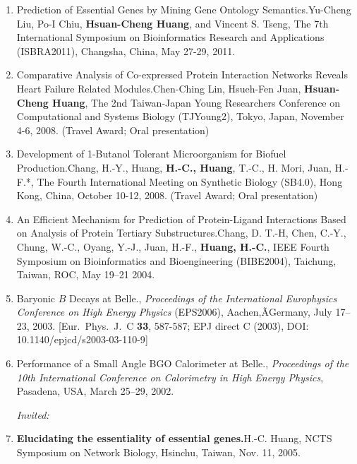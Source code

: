 \documentclass[10pt,a4paper]{article}
\def\mypub#1#2#3{{#1.}\newline #2, #3.}
\def\newpub#1#2#3{{\boldmath \bf #2.}\newline #1, #3.}
\begin{document}
\begin{enumerate}
\item
\mypub
{Prediction of Essential Genes by Mining Gene Ontology Semantics}
{Yu-Cheng Liu, Po-I Chiu, {\bf Hsuan-Cheng Huang}, and Vincent S. Tseng}
{The 7th International Symposium on Bioinformatics Research and Applications (ISBRA2011), Changsha, China, May 27-29, 2011}

\item
\mypub
{Comparative Analysis of Co-expressed Protein Interaction Networks Reveals Heart Failure Related Modules}
{Chen-Ching Lin, Hsueh-Fen Juan, {\bf Hsuan-Cheng Huang}}
{The 2nd Taiwan-Japan Young Researchers Conference on Computational and Systems Biology (TJYoung2), Tokyo, Japan, November 4-6, 2008}
(Travel Award; Oral presentation)

\item
\mypub
{Development of 1-Butanol Tolerant Microorganism for Biofuel Production}
{Chang, H.-Y., Huang, {\bf H.-C., Huang}, T.-C., H. Mori, Juan, H.-F.*} 
 {The Fourth International Meeting on Synthetic Biology (SB4.0), Hong Kong, China, October 10-12, 2008}
 (Travel Award; Oral presentation)

\item
\mypub
{An Efficient Mechanism for Prediction of Protein-Ligand Interactions Based on Analysis of Protein Tertiary Substructures}
{Chang, D. T.-H, Chen, C.-Y., Chung, W.-C., Oyang, Y.-J., Juan, H.-F., {\bf Huang, H.-C.}}
{IEEE Fourth Symposium on Bioinformatics and Bioengineering (BIBE2004), Taichung, Taiwan, ROC, May 19--21 2004}

\item
\mypub{Baryonic $B$ Decays at Belle}
{{\bf Hsuan-Cheng Huang}}
{{\it Proceedings of the International Europhysics Conference on High Energy Physics} (EPS2006), Aachen,ÃGermany, July 17--23, 2003}
[{Eur.\ Phys.\ J.\ C {\bf 33}, 587-587; EPJ direct C (2003), DOI: 10.1140/epjcd/s2003-03-110-9}]

\item
\mypub{Performance of a Small Angle BGO Calorimeter at Belle}
{{\bf H. C. Huang}}
{{\it Proceedings of the 10th International
Conference on Calorimetry in High Energy Physics}, Pasadena, USA, March 25--29, 2002}

\clearpage
\hspace{-0.4in} {\it Invited:}
~
\item
\newpub
{H.-C. Huang}
{Elucidating the essentiality of essential genes}
{NCTS Symposium on Network Biology, Hsinchu, Taiwan, Nov. 11, 2005}


\end{enumerate}
\end{document}
